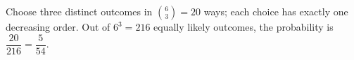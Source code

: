 Choose three distinct outcomes in $\binom63=20$ ways; each choice has exactly one decreasing order. Out of $6^3=216$ equally likely outcomes, the probability is $\dfrac{20}{216}=\boxed{\dfrac{5}{54}}$.
